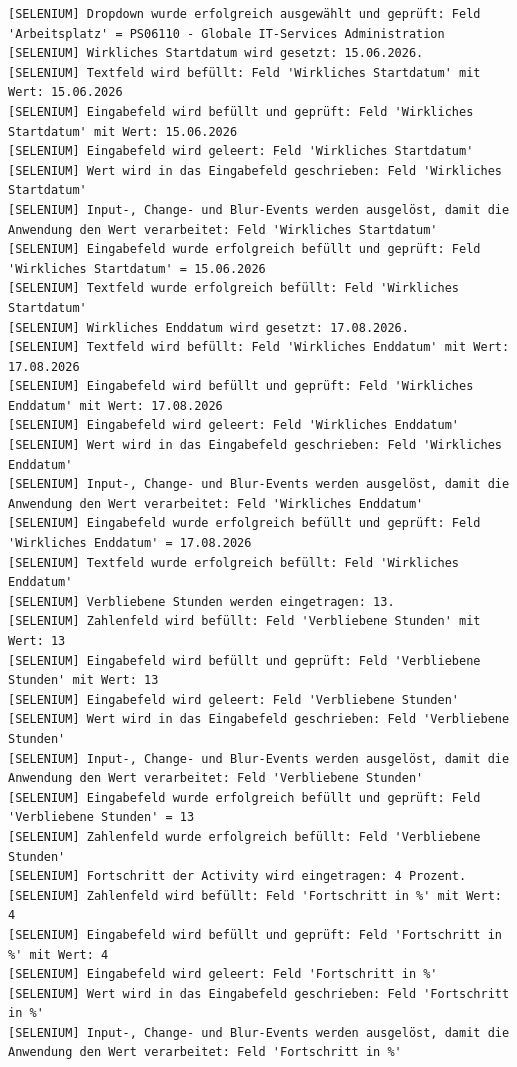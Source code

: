 \begin{lstlisting}[caption={Selenium -- Neue Activity (Erfolgreich)}, label={lst:sel_new_act_ok}, style=logStyle]
[SELENIUM] Dropdown wurde erfolgreich ausgewählt und geprüft: Feld 'Arbeitsplatz' = PS06110 - Globale IT-Services Administration
[SELENIUM] Wirkliches Startdatum wird gesetzt: 15.06.2026.
[SELENIUM] Textfeld wird befüllt: Feld 'Wirkliches Startdatum' mit Wert: 15.06.2026
[SELENIUM] Eingabefeld wird befüllt und geprüft: Feld 'Wirkliches Startdatum' mit Wert: 15.06.2026
[SELENIUM] Eingabefeld wird geleert: Feld 'Wirkliches Startdatum'
[SELENIUM] Wert wird in das Eingabefeld geschrieben: Feld 'Wirkliches Startdatum'
[SELENIUM] Input-, Change- und Blur-Events werden ausgelöst, damit die Anwendung den Wert verarbeitet: Feld 'Wirkliches Startdatum'
[SELENIUM] Eingabefeld wurde erfolgreich befüllt und geprüft: Feld 'Wirkliches Startdatum' = 15.06.2026
[SELENIUM] Textfeld wurde erfolgreich befüllt: Feld 'Wirkliches Startdatum'
[SELENIUM] Wirkliches Enddatum wird gesetzt: 17.08.2026.
[SELENIUM] Textfeld wird befüllt: Feld 'Wirkliches Enddatum' mit Wert: 17.08.2026
[SELENIUM] Eingabefeld wird befüllt und geprüft: Feld 'Wirkliches Enddatum' mit Wert: 17.08.2026
[SELENIUM] Eingabefeld wird geleert: Feld 'Wirkliches Enddatum'
[SELENIUM] Wert wird in das Eingabefeld geschrieben: Feld 'Wirkliches Enddatum'
[SELENIUM] Input-, Change- und Blur-Events werden ausgelöst, damit die Anwendung den Wert verarbeitet: Feld 'Wirkliches Enddatum'
[SELENIUM] Eingabefeld wurde erfolgreich befüllt und geprüft: Feld 'Wirkliches Enddatum' = 17.08.2026
[SELENIUM] Textfeld wurde erfolgreich befüllt: Feld 'Wirkliches Enddatum'
[SELENIUM] Verbliebene Stunden werden eingetragen: 13.
[SELENIUM] Zahlenfeld wird befüllt: Feld 'Verbliebene Stunden' mit Wert: 13
[SELENIUM] Eingabefeld wird befüllt und geprüft: Feld 'Verbliebene Stunden' mit Wert: 13
[SELENIUM] Eingabefeld wird geleert: Feld 'Verbliebene Stunden'
[SELENIUM] Wert wird in das Eingabefeld geschrieben: Feld 'Verbliebene Stunden'
[SELENIUM] Input-, Change- und Blur-Events werden ausgelöst, damit die Anwendung den Wert verarbeitet: Feld 'Verbliebene Stunden'
[SELENIUM] Eingabefeld wurde erfolgreich befüllt und geprüft: Feld 'Verbliebene Stunden' = 13
[SELENIUM] Zahlenfeld wurde erfolgreich befüllt: Feld 'Verbliebene Stunden'
[SELENIUM] Fortschritt der Activity wird eingetragen: 4 Prozent.
[SELENIUM] Zahlenfeld wird befüllt: Feld 'Fortschritt in %' mit Wert: 4
[SELENIUM] Eingabefeld wird befüllt und geprüft: Feld 'Fortschritt in %' mit Wert: 4
[SELENIUM] Eingabefeld wird geleert: Feld 'Fortschritt in %'
[SELENIUM] Wert wird in das Eingabefeld geschrieben: Feld 'Fortschritt in %'
[SELENIUM] Input-, Change- und Blur-Events werden ausgelöst, damit die Anwendung den Wert verarbeitet: Feld 'Fortschritt in %'

\end{lstlisting}
